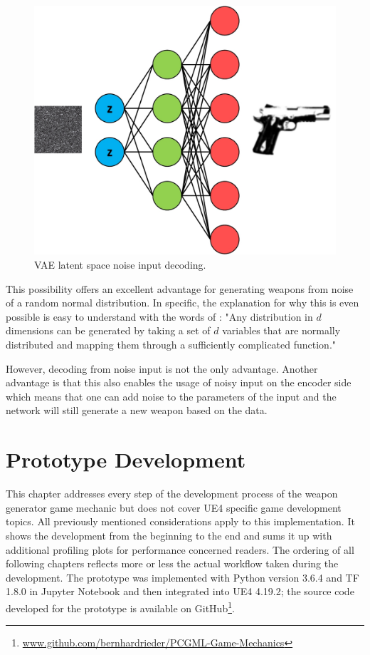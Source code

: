 \documentclass[MGS,Master,english]{twbook}%
\begin{document}
\begin{figure}[!htbp]
	\centering
	\includegraphics[width=0.7\linewidth]{PICs/NNs/variational_autoencoder_noise_decoding}
	\caption{\ac{VAE} latent space noise input decoding.} \label{fig::vae_noise_decoding}
\end{figure}

This possibility offers an excellent advantage for generating weapons from noise of a random normal distribution. In specific, the explanation for why this is even possible is easy to understand with the words of \citep[p. 6]{ml::vae::tutorial}: "Any distribution in $d$ dimensions can be generated by taking a set of $d$ variables that are normally distributed and mapping them through a sufficiently complicated function."

However, decoding from noise input is not the only advantage. Another advantage is that this also enables the usage of noisy input on the encoder side which means that one can add noise to the parameters of the input and the network will still generate a new weapon based on the data. 


%
%
\clearpage
\chapter{Prototype Development}
This chapter addresses every step of the development process of the weapon generator game mechanic but does not cover \ac{UE4} specific game development topics. All previously mentioned considerations apply to this implementation. It shows the development from the beginning to the end and sums it up with additional profiling plots for performance concerned readers. The ordering of all following chapters reflects more or less the actual workflow taken during the development. The prototype was implemented with Python version 3.6.4 and \ac{TF} 1.8.0 in Jupyter Notebook and then integrated into \ac{UE4} 4.19.2; the source code developed for the prototype is available on GitHub\footnote{\url{www.github.com/bernhardrieder/PCGML-Game-Mechanics}}. 
\end{document}
